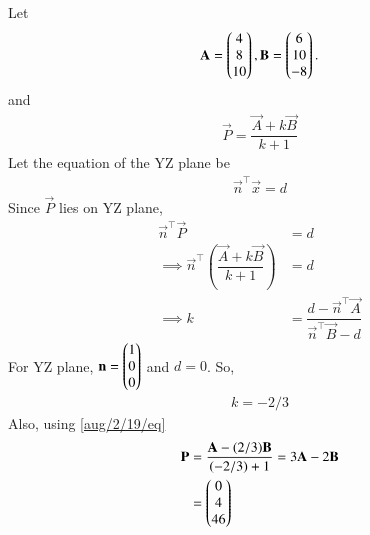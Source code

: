
 Let 
 \begin{align}
    \mathbf{A} = \begin{pmatrix}4\\8\\10\end{pmatrix}, \mathbf{B} = \begin{pmatrix}6\\10\\-8\end{pmatrix}.
 \end{align}
and 
\begin{align}
    \vec{P}=\dfrac{\vec{A}+k\vec{B}}{k+1} \label{aug/2/19/eq}
\end{align}
Let the equation of the YZ plane be
\begin{align}
    \vec{n}^\top\vec{x}=d
\end{align}
Since $\vec{P}$ lies on YZ plane,
\begin{align}
    \vec{n}^\top\vec{P}&=d\\
    \implies \vec{n}^\top\left(\dfrac{\vec{A}+k\vec{B}}{k+1}\right)&=d\\
    \implies k&=\dfrac{d-\vec{n}^\top\vec{A}}{\vec{n}^\top\vec{B}-d}
\end{align}
For YZ plane, $\mathbf{n}=\begin{pmatrix}1\\0\\0\end{pmatrix}$ and $d=0$. So,
\begin{align}
 k=-2/3
\end{align}
Also, using \eqref{aug/2/19/eq}
\begin{align}
    \mathbf{P}&=\dfrac{\mathbf{A}-(2/3)\mathbf{B}}{(-2/3)+1}=3\mathbf{A}-2\mathbf{B}\\
    &=\begin{pmatrix}0\\4\\46\end{pmatrix}
\end{align}
